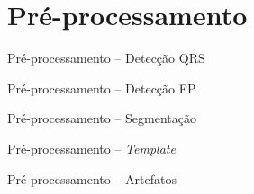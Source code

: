 
\section{Pré-processamento}

\begin{frame}{Pré-processamento -- Detecção QRS}
    
\end{frame}

\begin{frame}{Pré-processamento -- Detecção FP}
    
\end{frame}

\begin{frame}{Pré-processamento -- Segmentação}
    
\end{frame}

\begin{frame}{Pré-processamento -- \emph{Template}}
    
\end{frame}

\begin{frame}{Pré-processamento -- Artefatos}
    
\end{frame}
